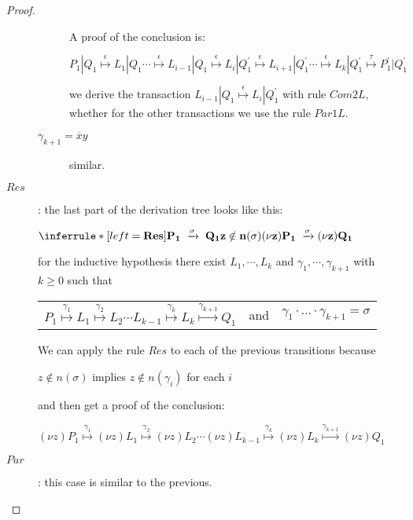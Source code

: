 \begin{proposition}
\begin{proof}
\begin{description}
\begin{description}
	    A proof of the conclusion is:
	    \begin{center}
	      $
		  P_{1}|Q_{1} \stackrel{\epsilon}{\longmapsto} L_{1}|Q_{1} 
		  \cdots
			      \stackrel{\epsilon}{\longmapsto} L_{i-1}|Q_{1} 
			      \stackrel{\epsilon}{\longmapsto} L_{i}|Q_{1}^{'}
			      \stackrel{\epsilon}{\longmapsto} L_{i+1}|Q_{1}^{'}
		  \cdots 
			      \stackrel{\epsilon}{\longmapsto} L_{k}|Q_{1}^{'}
			      \stackrel{\tau}{\longmapsto} P_{1}^{'}|Q_{1}^{'}$	  
	    \end{center}
	    we derive the transaction $ L_{i-1}|Q_{1} \stackrel{\epsilon}{\longmapsto} L_{i}|Q_{1}^{'}$ with rule $Com2L$, whether for the other transactions  we use the rule $Par1L$.
	  \item[$\gamma_{k+1}=\overline{x}y$] similar.
	\end{description}
      \item[$Res$]: 
	the last part of the derivation tree looks like this:
	\begin{center}
	  $\inferrule* [left=\bf{Res}]{
	      P_{1}\; \xrightarrow{\sigma}\; Q_{1}
	    \\
	      z\notin n(\sigma)
	  }{
	    (\nu z) P_{1} \;\xrightarrow{\sigma} (\nu z) Q_{1}
	  }$
	\end{center}
	for the inductive hypothesis there exist $L_{1}, \cdots, L_{k}$ and $\gamma_{1}, \cdots, \gamma_{k+1}$ with $k\geq 0$ such that 
	\begin{center}
	  \begin{tabular}{lll}
	    $P_{1} \stackrel{\gamma_{1}}{\longmapsto} L_{1}  \stackrel{\gamma_{2}}{\longmapsto} L_{2} \cdots L_{k-1} \stackrel{\gamma_{k}}{\longmapsto} L_{k} \stackrel{\gamma_{k+1}}{\longmapsto} Q_{1}$ 
	  &
	    and
	  &
	    $\gamma_{1} \cdot \ldots \cdot \gamma_{k+1} =  \sigma$
	  \end{tabular}
	\end{center}
	We can apply the rule $Res$ to each of the previous transitions because 
	\begin{center}
	  $z\notin n(\sigma)$ implies $z\notin n(\gamma_{i})$ for each $i$
	\end{center}
	and then get a proof of the conclusion:
	\begin{center}
	  $(\nu z)P_{1} \stackrel{\gamma_{1}}{\longmapsto} (\nu z)L_{1}  \stackrel{\gamma_{2}}{\longmapsto} (\nu z)L_{2} \cdots (\nu z)L_{k-1} \stackrel{\gamma_{k}}{\longmapsto} (\nu z)L_{k} \stackrel{\gamma_{k+1}}{\longmapsto} (\nu z)Q_{1}$
	\end{center}
      \item[$Par$]: this case is similar to the previous.

\end{description}
\end{proof}
\end{proposition}
